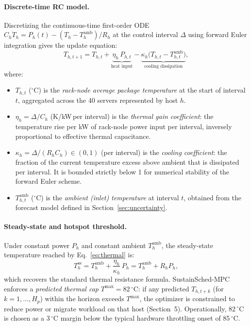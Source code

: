 \documentclass[a4paper,fleqn]{cas-dc}
\begin{document}
\paragraph{Discrete-time RC model.}
Discretizing the continuous-time first-order ODE $C_h \dot{T}_{h} = P_{h}(t) - (T_h - T^{\mathrm{amb}}_{h})/R_h$ at the control interval $\Delta$ using forward Euler integration gives the update equation:
\begin{equation}
\label{eq:thermal}
T_{h,t+1} = T_{h,t} + \underbrace{\eta_h \, P_{h,t}}_{\text{heat input}} - \underbrace{\kappa_h \bigl(T_{h,t} - T^{\mathrm{amb}}_{h,t}\bigr)}_{\text{cooling dissipation}},
\end{equation}
where:
\begin{itemize}
  \item $T_{h,t}$ ($^{\circ}$C) is the \emph{rack-node average package temperature} at the start of interval $t$, aggregated across the 40 servers represented by host $h$.
  \item $\eta_h = \Delta / C_h$ (K/kW\,per interval) is the \emph{thermal gain coefficient}: the temperature rise per kW of rack-node power input per interval, inversely proportional to effective thermal capacitance.
  \item $\kappa_h = \Delta / (R_h C_h) \in (0,1)$ (per interval) is the \emph{cooling coefficient}: the fraction of the current temperature excess above ambient that is dissipated per interval. It is bounded strictly below 1 for numerical stability of the forward Euler scheme.
  \item $T^{\mathrm{amb}}_{h,t}$ ($^{\circ}$C) is the \emph{ambient (inlet) temperature} at interval $t$, obtained from the forecast model defined in Section~\ref{sec:uncertainty}.
\end{itemize}

\paragraph{Steady-state and hotspot threshold.}
Under constant power $P_{h}$ and constant ambient $T^{\mathrm{amb}}_h$, the steady-state temperature reached by Eq.~\eqref{eq:thermal} is:
\begin{equation}
\label{eq:thermal_ss}
T^{\mathrm{ss}}_{h} = T^{\mathrm{amb}}_h + \frac{\eta_h}{\kappa_h} \, P_{h} = T^{\mathrm{amb}}_h + R_h P_{h},
\end{equation}
which recovers the standard thermal resistance formula. SustainSched-MPC enforces a \emph{predicted thermal cap} $T^{\max} = 82\,^{\circ}$C: if any predicted $T_{h,t+k}$ (for $k = 1, \ldots, H_p$) within the horizon exceeds $T^{\max}$, the optimizer is constrained to reduce power or migrate workload on that host (Section~5). Operationally, 82$\,^{\circ}$C is chosen as a 3$\,^{\circ}$C margin below the typical hardware throttling onset of 85$\,^{\circ}$C.
\end{document}
